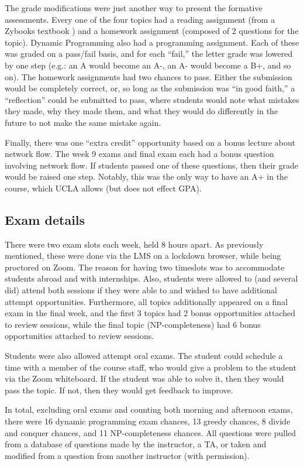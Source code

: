 \documentclass{article}
\begin{document}
The grade modifications were just another way to present the formative assessments. Every one of the four topics had a reading assignment (from a Zybooks textbook \cite{gordon2021shift}) and a homework assignment (composed of 2 questions for the topic). Dynamic Programming also had a programming assignment. Each of these was graded on a pass/fail basis, and for each ``fail,'' the letter grade was lowered by one step (e.g.: an A would become an A-, an A- would become a B+, and so on). The homework assignments had two chances to pass. Either the submission would be completely correct, or, so long as the submission was ``in good faith,'' a ``reflection'' could be submitted to pass, where students would note what mistakes they made, why they made them, and what they would do differently in the future to not make the same mistake again.

Finally, there was one ``extra credit'' opportunity based on a bonus lecture about network flow. The week 9 exams and final exam each had a bonus question involving network flow. If students passed one of these questions, then their grade would be raised one step. Notably, this was the only way to have an A+ in the course, which UCLA allows (but does not effect GPA).

\subsection{Exam details}
There were two exam slots each week, held 8 hours apart. As previously mentioned, these were done via the LMS on a lockdown browser, while being proctored on Zoom. The reason for having two timeslots was to accommodate students abroad and with internships. Also, students were allowed to (and several did) attend both sessions if they were able to and wished to have additional attempt opportunities. Furthermore, all topics additionally appeared on a final exam in the final week, and the first 3 topics had 2 bonus opportunities attached to review sessions, while the final topic (NP-completeness) had 6 bonus opportunities attached to review sessions. 

Students were also allowed attempt oral exams. The student could schedule a time with a member of the course staff, who would give a problem to the student via the Zoom whiteboard. If the student was able to solve it, then they would pass the topic. If not, then they would get feedback to improve.

In total, excluding oral exams and counting both morning and afternoon exams, there were 16 dynamic programming exam chances, 13 greedy chances, 8 divide and conquer chances, and 11 NP-completeness chances. All questions were pulled from a database of questions made by the instructor, a TA, or taken and modified from a question from another instructor (with permission).
\end{document}
